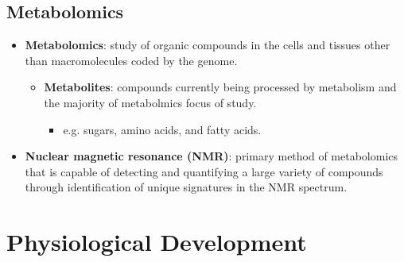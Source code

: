 \documentclass[12pt,a4paper]{article}
\begin{document}
\subsection{Metabolomics}
\begin{itemize}
    \item \textbf{Metabolomics}: study of organic compounds in the cells and tissues other than macromolecules coded by the genome.
        \begin{itemize}
            \item \textbf{Metabolites}: compounds currently being processed by metabolism and the majority of metabolmics focus of study.
                \begin{itemize}
                    \item e.g. sugars, amino acids, and fatty acids.
                \end{itemize}
        \end{itemize}
    \item \textbf{Nuclear magnetic resonance (NMR)}: primary method of metabolomics that is capable of detecting and quantifying a large variety of compounds through identification of unique signatures in the NMR spectrum.
\end{itemize}

\clearpage
\section{Physiological Development}
\end{document}
